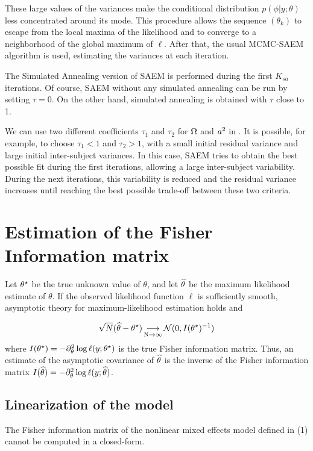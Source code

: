 These large values of the variances make the conditional distribution $p(\phi|y;\theta )$ less concentrated around its mode. This procedure allows the sequence $(\theta_k)$ to escape from the local maxima of the likelihood and to converge to a neighborhood of the global maximum of $\ell$. After that, the usual MCMC-SAEM algorithm is used, estimating the variances at each iteration.


 The Simulated Annealing version of SAEM is performed during the first $K_{sa}$ iterations. Of course, SAEM without any simulated annealing can be run by setting $\tau=0$. On the other hand, simulated annealing is obtained with $\tau$ close to 1.

 We can use two different coefficients $\tau_1$ and $\tau_2$ for ${\Omega}$ and $a^2$ in \monolix. It is possible, for example, to choose $\tau_1<1$ and $\tau_2>1$, with a small initial residual variance and large initial inter-subject variances. In this case, SAEM tries to obtain the best possible fit during the first iterations, allowing a large inter-subject variability. During the next iterations, this variability is reduced and the residual variance increases until reaching the best possible trade-off between these two criteria.

\section{Estimation of the Fisher Information matrix} \label{sec_fish} Let ${\theta^\star}$ be the true unknown value of $\theta$, and let ${\widehat{\theta}}$ be the maximum likelihood estimate of $\theta$. If the observed likelihood function $\ell$ is sufficiently smooth, asymptotic theory for maximum-likelihood estimation holds and

\begin{equation}
\sqrt{N}({\widehat{\theta}}-{\theta^\star}) \mathop{\longrightarrow}\limits_{\mathrm{N\to \infty}}^{\mathrm{}} {\mathcal N}(0,I({\theta^\star})^{-1})
\end{equation}
where $I({\theta^\star})=- \partial^2_\theta \log \ell(y;{\theta^\star})$ is the true Fisher information matrix. Thus, an estimate of the asymptotic covariance of ${\widehat{\theta}}$ is the  inverse of the Fisher information matrix $I({\widehat{\theta}})=- \partial^2_\theta \log \ell(y;{\widehat{\theta}})$.

\subsection{Linearization of the model}
The Fisher information matrix of the nonlinear mixed effects model defined in (1) cannot be computed in a closed-form.


